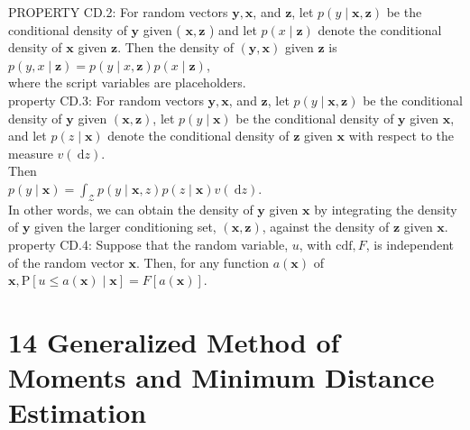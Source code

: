 \documentclass[10pt]{article}
\begin{document}
PROPERTY CD.2: For random vectors $\mathbf{y}, \mathbf{x}$, and $\mathbf{z}$, let $p(y \mid \mathbf{x}, \mathbf{z})$ be the conditional density of $\mathbf{y}$ given ( $\mathbf{x}, \mathbf{z}$ ) and let $p(x \mid \mathbf{z})$ denote the conditional density of $\mathbf{x}$ given $\mathbf{z}$. Then the density of $(\mathbf{y}, \mathbf{x})$ given $\mathbf{z}$ is\\
$p(y, x \mid \mathbf{z})=p(y \mid x, \mathbf{z}) p(x \mid \mathbf{z})$,\\
where the script variables are placeholders.\\
property CD.3: For random vectors $\mathbf{y}, \mathbf{x}$, and $\mathbf{z}$, let $p(y \mid \mathbf{x}, \mathbf{z})$ be the conditional density of $\mathbf{y}$ given $(\mathbf{x}, \mathbf{z})$, let $p(y \mid \mathbf{x})$ be the conditional density of $\mathbf{y}$ given $\mathbf{x}$, and let $p(z \mid \mathbf{x})$ denote the conditional density of $\mathbf{z}$ given $\mathbf{x}$ with respect to the measure $v(\mathrm{~d} z)$.\\
Then\\
$p(y \mid \mathbf{x})=\int_{\mathscr{Z}} p(y \mid \mathbf{x}, z) p(z \mid \mathbf{x}) v(\mathrm{~d} z)$.\\
In other words, we can obtain the density of $\mathbf{y}$ given $\mathbf{x}$ by integrating the density of $\mathbf{y}$ given the larger conditioning set, $(\mathbf{x}, \mathbf{z})$, against the density of $\mathbf{z}$ given $\mathbf{x}$.\\
property CD.4: Suppose that the random variable, $u$, with $\mathrm{cdf}, F$, is independent of the random vector $\mathbf{x}$. Then, for any function $a(\mathbf{x})$ of $\mathbf{x}, \mathrm{P}[u \leq a(\mathbf{x}) \mid \mathbf{x}]=F[a(\mathbf{x})]$.

\section*{14 Generalized Method of Moments and Minimum Distance Estimation}
\end{document}
